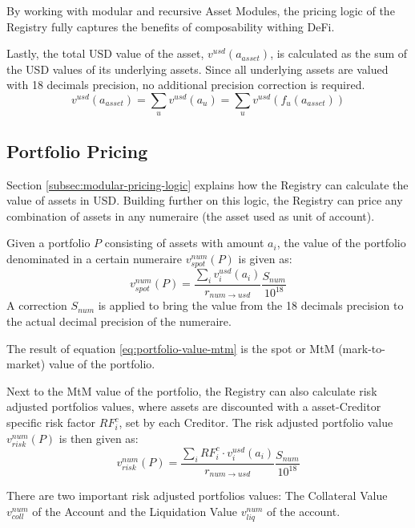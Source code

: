 \documentclass[sigconf,nonacm]{acmart}
\begin{document}
By working with modular and recursive Asset Modules, the pricing logic of the Registry fully captures the benefits of composability withing DeFi.

Lastly, the total USD value of the asset, $v^{usd}(a_{asset})$, is calculated as the sum of the USD values of its underlying assets.
Since all underlying assets are valued with 18 decimals precision, no additional precision correction is required.
\begin{equation}
    v^{usd}(a_{asset}) = \sum_{u}{v^{usd}(a_{u})} = \sum_{u}{v^{usd}(f_{u}(a_{asset}))}
\end{equation}

\subsection{Portfolio Pricing}
\label{subsec:portfolio-pricing}
Section \ref{subsec:modular-pricing-logic} explains how the Registry can calculate the value of assets in USD.
Building further on this logic, the Registry can price any combination of assets in any numeraire (the asset used as unit of account).

Given a portfolio $P$ consisting of assets with amount $a_{i}$, the value of the portfolio denominated in a certain numeraire $v_{spot}^{num}(P)$ is given as:
\begin{equation}
    \label{eq:portfolio-value-mtm}
    v_{spot}^{num}(P) = \frac{\sum_{i}{v^{usd}_{i}(a_{i})}}{r_{num\rightarrow usd}}\frac{S_{num}}{10^{18}}
\end{equation}
A correction $S_{num}$ is applied to bring the value from the 18 decimals precision to the actual decimal precision of the numeraire.

The result of equation \ref{eq:portfolio-value-mtm} is the spot or MtM (mark-to-market) value of the portfolio.

Next to the MtM value of the portfolio, the Registry can also calculate risk adjusted portfolios values,
where assets are discounted with a asset-Creditor specific risk factor $RF_{i}^{c}$, set by each Creditor.
The risk adjusted portfolio value $v_{risk}^{num}(P)$ is then given as:
\begin{equation}
    \label{eq:portfolio-value-risk-adjusted}
    v_{risk}^{num}(P) = \frac{\sum_{i}{RF_{i}^{c} \cdot v^{usd}_{i}(a_{i})}}{r_{num\rightarrow usd}}\frac{S_{num}}{10^{18}}
\end{equation}

There are two important risk adjusted portfolios values: The Collateral Value $v_{coll}^{num}$ of the Account and the Liquidation Value $v_{liq}^{num}$ of the account.
\end{document}
